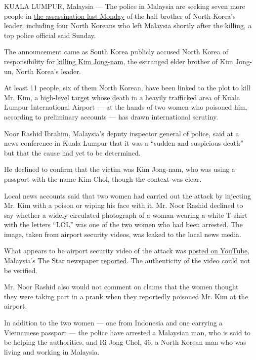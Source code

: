 KUALA LUMPUR, Malaysia --- The police in Malaysia are seeking seven more
people in
\href{https://www.nytimes3xbfgragh.onion/2017/02/14/world/asia/kim-jong-un-brother-killed-malaysia.html}{the
assassination last Monday} of the half brother of North Korea's leader,
including four North Koreans who left Malaysia shortly after the
killing, a top police official said Sunday.

The announcement came as South Korea publicly accused North Korea of
responsibility for
\href{https://www.nytimes3xbfgragh.onion/2017/02/15/world/asia/kim-jong-nam-assassination-north-korea.html}{killing
Kim Jong-nam}, the estranged elder brother of Kim Jong-un, North Korea's
leader.

At least 11 people, six of them North Korean, have been linked to the
plot to kill Mr. Kim, a high-level target whose death in a heavily
trafficked area of Kuala Lumpur International Airport --- at the hands
of two women who poisoned him, according to preliminary accounts --- has
drawn international scrutiny.

Noor Rashid Ibrahim, Malaysia's deputy inspector general of police, said
at a news conference in Kuala Lumpur that it was a ``sudden and
suspicious death'' but that the cause had yet to be determined.

He declined to confirm that the victim was Kim Jong-nam, who was using a
passport with the name Kim Chol, though the context was clear.

Local news accounts said that two women had carried out the attack by
injecting Mr. Kim with a poison or wiping his face with it. Mr. Noor
Rashid declined to say whether a widely circulated photograph of a woman
wearing a white T-shirt with the letters ``LOL'' was one of the two
women who had been arrested. The image, taken from airport security
videos, was leaked to the local news media.

What appears to be airport security video of the attack was
\href{https://www.youtube.com/watch?v=Zjfm_XOxLOs\&t=196s}{posted on
YouTube}, Malaysia's The Star newspaper
\href{http://www.thestar.com.my/news/nation/2017/02/19/video-clip-allegedly-of-jong-nam-murder-appears-on-youtube/}{reported}.
The authenticity of the video could not be verified.

Mr. Noor Rashid also would not comment on claims that the women thought
they were taking part in a prank when they reportedly poisoned Mr. Kim
at the airport.

In addition to the two women --- one from Indonesia and one carrying a
Vietnamese passport --- the police have arrested a Malaysian man, who is
said to be helping the authorities, and Ri Jong Chol, 46, a North Korean
man who was living and working in Malaysia.

